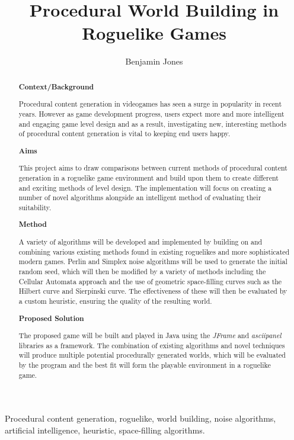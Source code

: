 \documentclass[12pt,a4paper]{article}
\title{Procedural World Building in Roguelike Games}
\author{Benjamin Jones}
\begin{document}
\maketitle

\begin{abstract}

{\bf Context/Background}

Procedural content generation in videogames has seen a surge in popularity in recent years. However as game development progress, users expect more and more intelligent and engaging game level design and as a result, investigating new, interesting methods of procedural content generation is vital to keeping end users happy.

{\bf Aims}

This project aims to draw comparisons between current methods of procedural content generation in a roguelike game environment and build upon them to create different and exciting methods of level design. The implementation will focus on creating a number of novel algorithms alongside an intelligent method of evaluating their suitability. 

{\bf Method}

A variety of algorithms will be developed and implemented by building on and combining various existing methods found in existing roguelikes and more sophisticated modern games. Perlin and Simplex noise algorithms will be used to generate the initial random seed, which will then be modified by a variety of methods including the Cellular Automata approach and the use of geometric space-filling curves such as the Hilbert curve and Sierpinski curve. The effectiveness of these will then be evaluated by a custom heuristic, ensuring the quality of the resulting world. 

{\bf Proposed Solution}

The proposed game will be built and played in Java using the \emph{JFrame} and \emph{asciipanel} libraries as a framework. The combination of existing algorithms and novel techniques will produce multiple potential procedurally generated worlds, which will be evaluated by the program and the best fit will form the playable environment in a roguelike game. 

\end{abstract}

\begin{keywords}
Procedural content generation, roguelike, world building, noise algorithms, artificial intelligence, heuristic, space-filling algorithms.
\end{keywords}
\end{document}
